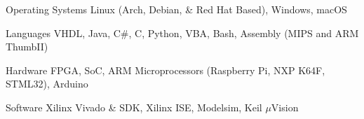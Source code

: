 
\begin{cvskills}
	\cvskill
	{Operating Systems}
	{Linux (Arch, Debian, \& Red Hat Based), Windows, macOS}

	\cvskill
	{Languages}
	{VHDL, Java, C\#, C, Python, VBA, Bash, Assembly (MIPS and ARM ThumbII)}

	\cvskill
	{Hardware}
	{FPGA, SoC, ARM Microprocessors (Raspberry Pi, NXP K64F, STML32), Arduino}

	\cvskill
	{Software}
	{Xilinx Vivado \& SDK, Xilinx ISE, Modelsim, Keil $\mu$Vision}

\end{cvskills}
